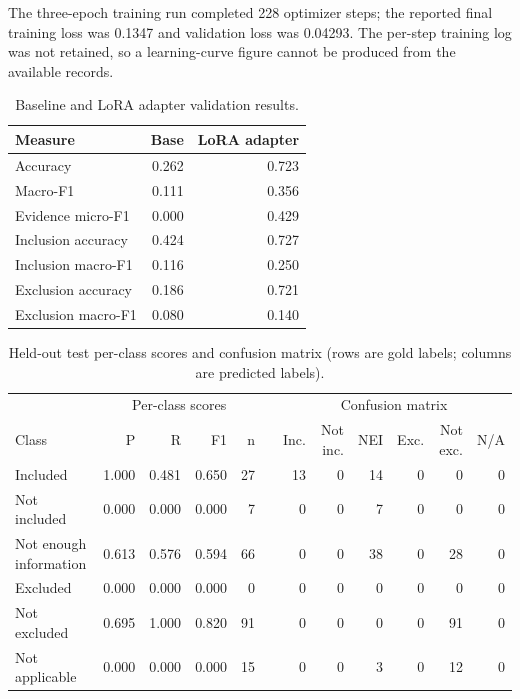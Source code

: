 \documentclass[conference]{IEEEtran}
\begin{document}
The three-epoch training run completed 228 optimizer steps; the reported final training loss was 0.1347 and validation loss was 0.04293. The per-step training log was not retained, so a learning-curve figure cannot be produced from the available records.

\begin{table}[ht]
\caption{Baseline and LoRA adapter validation results.}
\centering
\begin{tabular}{lrr}\toprule Measure & Base & LoRA adapter\\\midrule Accuracy & 0.262 & 0.723\\Macro-F1 & 0.111 & 0.356\\Evidence micro-F1 & 0.000 & 0.429\\Inclusion accuracy & 0.424 & 0.727\\Inclusion macro-F1 & 0.116 & 0.250\\Exclusion accuracy & 0.186 & 0.721\\Exclusion macro-F1 & 0.080 & 0.140\\\bottomrule\end{tabular}
\end{table}

\begin{table}[t]
\caption{Held-out test per-class scores and confusion matrix (rows are gold labels; columns are predicted labels).}
\label{tab:testclass}
\centering\small
\begin{tabular}{lrrrrr|rrrrrr}\toprule
& \multicolumn{4}{c}{Per-class scores} & & \multicolumn{6}{c}{Confusion matrix}\\
Class & P & R & F1 & n & & Inc. & Not inc. & NEI & Exc. & Not exc. & N/A\\\midrule
Included & 1.000 & 0.481 & 0.650 & 27 & & 13 & 0 & 14 & 0 & 0 & 0\\
Not included & 0.000 & 0.000 & 0.000 & 7 & & 0 & 0 & 7 & 0 & 0 & 0\\
Not enough information & 0.613 & 0.576 & 0.594 & 66 & & 0 & 0 & 38 & 0 & 28 & 0\\
Excluded & 0.000 & 0.000 & 0.000 & 0 & & 0 & 0 & 0 & 0 & 0 & 0\\
Not excluded & 0.695 & 1.000 & 0.820 & 91 & & 0 & 0 & 0 & 0 & 91 & 0\\
Not applicable & 0.000 & 0.000 & 0.000 & 15 & & 0 & 0 & 3 & 0 & 12 & 0\\\bottomrule
\end{tabular}
\end{table}
\end{document}
